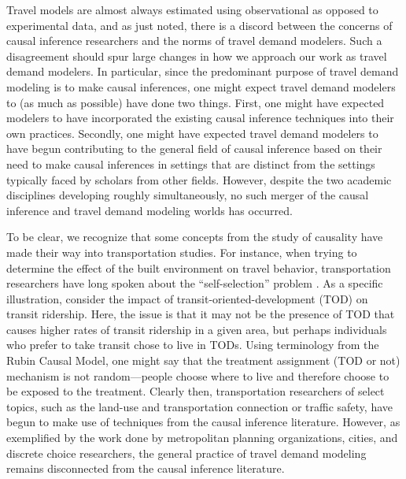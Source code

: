 Travel models are almost always estimated using observational as opposed to experimental data, and as just noted, there is a discord between the concerns of causal inference researchers and the norms of travel demand modelers. Such a disagreement should spur large changes in how we approach our work as travel demand modelers. In particular, since the predominant purpose of travel demand modeling is to make causal inferences, one might expect travel demand modelers to (as much as possible) have done two things. First, one might have expected modelers to have incorporated the existing causal inference techniques into their own practices. Secondly, one might have expected travel demand modelers to have begun contributing to the general field of causal inference based on their need to make causal inferences in settings that are distinct from the settings typically faced by scholars from other fields. However, despite the two academic disciplines developing roughly simultaneously, no such merger of the causal inference and travel demand modeling worlds has occurred.

To be clear, we recognize that some concepts from the study of causality have made their way into transportation studies. For instance, when trying to determine the effect of the built environment on travel behavior, transportation researchers have long spoken about the ``self-selection'' problem \citep[see for example the review of][]{cao2009examining}. As a specific illustration, consider the impact of transit-oriented-development (TOD) on transit ridership. Here, the issue is that it may not be the presence of TOD that causes higher rates of transit ridership in a given area, but perhaps individuals who prefer to take transit chose to live in TODs. Using terminology from the Rubin Causal Model, one might say that the treatment assignment (TOD or not) mechanism is not random---people choose where to live and therefore choose to be exposed to the treatment. Clearly then, transportation researchers of select topics, such as the land-use and transportation connection or traffic safety, have begun to make use of techniques from the causal inference literature. However, as exemplified by the work done by metropolitan planning organizations, cities, and discrete choice researchers, the general practice of travel demand modeling remains disconnected from the causal inference literature.

